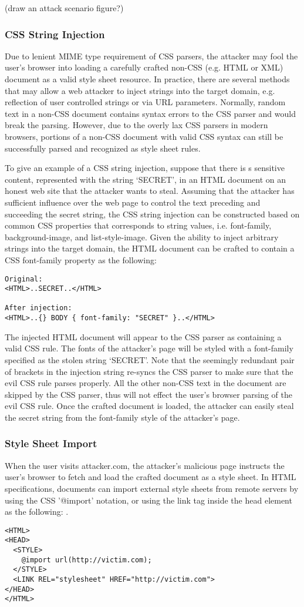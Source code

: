 \documentclass{acm_proc_article-sp}
\begin{document}
(draw an attack scenario figure?)

\subsubsection{CSS String Injection}
Due to lenient MIME type requirement of CSS parsers, the attacker may fool the user's browser into loading a carefully crafted non-CSS (e.g. HTML or XML) document as a valid style sheet resource. In practice, there are several methods that may allow a web attacker to inject strings into the target domain, e.g. reflection of user controlled strings or via URL parameters. Normally, random text in a non-CSS document contains syntax errors to the CSS parser and would break the parsing. However, due to the overly lax CSS parsers in modern browsers, portions of a non-CSS document with valid CSS syntax can still be successfully parsed and recognized as style sheet rules.

To give an example of a CSS string injection, suppose that there is s sensitive content, represented with the string `SECRET', in an HTML document on an honest web site that the attacker wants to steal. Assuming that the attacker has sufficient influence over the web page to control the text preceding and succeeding the secret string, the CSS string injection can be constructed based on common CSS properties that corresponds to string values, i.e. font-family, background-image, and list-style-image. Given the ability to inject arbitrary strings into the target domain, the HTML document can be crafted to contain a CSS font-family property as the following:
\begin{verbatim}
Original:
<HTML>..SECRET..</HTML>

After injection:
<HTML>..{} BODY { font-family: "SECRET" }..</HTML>
\end{verbatim}
The injected HTML document will appear to the CSS parser as containing a valid CSS rule. The fonts of the attacker's page will be styled with a font-family specified as the stolen string `SECRET'. Note that the seemingly redundant pair of brackets in the injection string re-syncs the CSS parser to make sure that the evil CSS rule parses properly. All the other non-CSS text in the document are skipped by the CSS parser, thus will not effect the user's browser parsing of the evil CSS rule. Once the crafted document is loaded, the attacker can easily steal the secret string from the font-family style of the attacker's page.

\subsubsection{Style Sheet Import}
When the user visits attacker.com, the attacker's malicious page instructs the user's browser to fetch and load the crafted document as a style sheet. In HTML specifications\cite{html}, documents can import external style sheets from remote servers by using the CSS '@import' notation, or using the link tag inside the head element as the following: .
\begin{verbatim}
<HTML>
<HEAD>
  <STYLE>
    @import url(http://victim.com);
  </STYLE>
  <LINK REL="stylesheet" HREF="http://victim.com">
</HEAD>
</HTML>
\end{verbatim}
\end{document}
